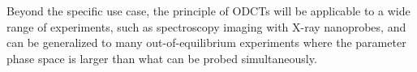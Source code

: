 Beyond the specific use case, the principle of ODCTs will be applicable to a wide range of experiments, such as spectroscopy imaging with X-ray nanoprobes, and can be generalized to many out-of-equilibrium experiments where the parameter phase space is larger than what can be probed simultaneously.






